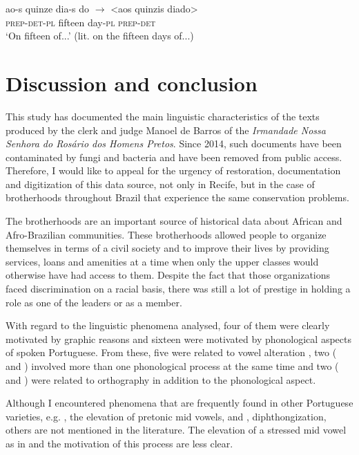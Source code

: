 \documentclass[output=paper,colorlinks,citecolor=brown]{langscibook}
\begin{document}
\ex \label{ex:6:21b}
\gll ao-s  quinze  dia-s  do $\rightarrow$ <aos quinzis diado> \\
 \textsc{prep-det-pl} fifteen day-\textsc{pl} \textsc{prep-det} \\
\glt ‘On fifteen of...’ (lit. on the fifteen days of...)
\z
\z


\section{Discussion and conclusion}

This study has documented the main linguistic characteristics of the texts produced by the clerk and judge Manoel de Barros of the \emph{Irmandade Nossa Senhora do Rosário dos Homens Pretos}. Since 2014, such documents have been contaminated by fungi and bacteria and have been removed from public access. Therefore, I would like to appeal for the urgency of restoration, documentation and digitization of this data source, not only in Recife, but in the case of brotherhoods throughout Brazil that experience the same conservation problems.

The brotherhoods are an important source of historical data about African and Afro-Brazilian communities. These brotherhoods allowed people to organize themselves in terms of  a civil society and to improve their lives by providing services, loans and amenities at a time when only the upper classes would otherwise have had access to them. Despite the fact that those organizations faced discrimination on a racial basis, there was still a lot of prestige in holding a role as one of the leaders or as a member.

With regard to the linguistic phenomena analysed, four of them were clearly motivated by graphic reasons and sixteen were motivated by phonological aspects of spoken Portuguese. From these, five were related to vowel alteration , two ( and ) involved more than one phonological process at the same time and two ( and ) were related to orthography in addition to the phonological aspect.

Although I encountered phenomena that are frequently found in other Portuguese varieties, e.g. , the elevation of pretonic mid vowels, and , diphthongization, others are not mentioned in the literature. The elevation of a stressed mid vowel as in  and the motivation of this process are less clear.
\end{document}
